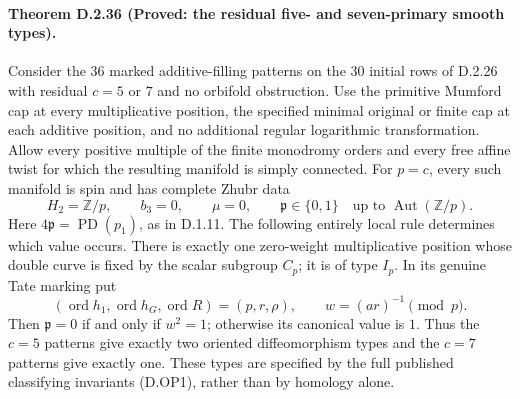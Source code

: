 \paragraph{Theorem D.2.36 (Proved: the residual five- and seven-primary smooth types).}
Consider the $36$ marked additive-filling patterns on the $30$ initial
rows of D.2.26 with residual $c=5$ or $7$ and no orbifold obstruction.
Use the primitive Mumford cap at every multiplicative position, the
specified minimal original or finite cap at each additive position,
and no additional regular logarithmic transformation. Allow every
positive multiple of the finite monodromy orders and every free
affine twist for which the resulting manifold is simply connected.
For $p=c$, every such manifold is spin and has complete Zhubr data
\[
 H_2=\mathbb Z/p,\qquad b_3=0,\qquad \mu=0,
 \qquad \mathfrak p\in\{0,1\}\quad\text{up to }\operatorname{Aut}(\mathbb Z/p).
 \tag{D.OP1}
\]
Here $4\mathfrak p=\operatorname{PD}(p_1)$, as in D.1.11.
The following entirely local rule determines which value occurs.
There is exactly one zero-weight multiplicative position
whose double curve is fixed by the scalar subgroup $C_p$; it is of
type $I_p$. In its genuine Tate marking put
\[
 (\operatorname{ord}h_1,\operatorname{ord}h_G,
                  \operatorname{ord}R)=(p,r,\rho),\qquad
 w=(ar)^{-1}\pmod p.
\]
Then $\mathfrak p=0$ if and only if $w^2=1$; otherwise its canonical
value is $1$. Thus the $c=5$ patterns give exactly two oriented
diffeomorphism types and the $c=7$ patterns give exactly one.
These types are specified by the full published classifying
invariants (D.OP1), rather than by homology alone.

